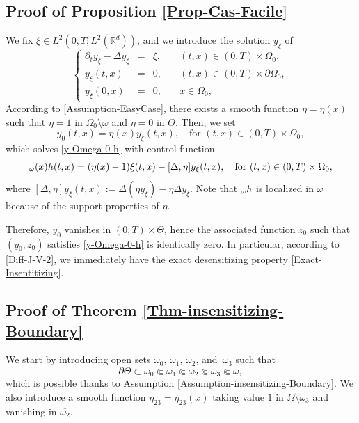\documentclass[11pt]{article}
\makeatletter
\numberwithin{equation}{section}
\DeclareRobustCommand{\mathbbm}[1]{\csname jepbb@#1\endcsname}
\newcommand\R{{\mathbb R}}
\theoremstyle{definition}
\makeatother
\begin{document}
\subsection{Proof of Proposition \ref{Prop-Cas-Facile}}
\label{Sec-Proof-Prop-Cas-Facile}
We fix $\xi \in L^2(0,T; L^2(\R^d))$, and we introduce the solution $y_\xi$ of
\begin{equation*}
\left\{
\begin{array}{rcll}
\partial_t y_\xi - \Delta y_\xi &=& \xi, \quad & (t,x) \in (0,T) \times \Omega_0,
\\
y_\xi(t, x) &=& 0, \quad & (t,x) \in (0,T) \times \partial \Omega_0,
\\
y_\xi(0,x) &=& 0, \quad & x \in \Omega_0,
\end{array}
\right.
\end{equation*}
According to \eqref{Assumption-EasyCase}, there exists a smooth function $\eta = \eta(x)$ such that $\eta = 1$ in $\Omega_0 \setminus \omega$ and $\eta=0$ in $\Theta$. Then, we set
\[
y_0(t,x) = \eta(x) y_\xi(t,x), \quad \text{for } (t,x) \in (0,T) \times \Omega_0,
\]
which solves \eqref{y-Omega-0-h} with control function
\[
\mathbbm{1}_{\omega}(x)h(t,x) = (\eta(x) -1) \xi(t,x) - [\Delta, \eta] y_\xi(t,x), \quad \text{for } (t,x) \in (0,T) \times \Omega_0,
\]
where $[\Delta, \eta] y_\xi(t,x):=\Delta (\eta y_\xi)-\eta \Delta y_\xi$. Note that $\mathbbm{1}_{\omega} h$ is localized in $\omega$ because of the support properties of $\eta$.

Therefore, $y_0$ vanishes in $(0,T) \times \Theta$, hence the associated function $z_0$ such that $(y_0,z_0)$ satisfies \eqref{y-Omega-0-h} is identically zero. In particular, according to \eqref{Diff-J-V-2}, we immediately have the exact desensitizing property \eqref{Exact-Insentitizing}.

\subsection{Proof of Theorem \ref{Thm-insensitizing-Boundary}}
\label{Sec-Proof-Thm-insensitizing-Boundary}

We start by introducing open sets $\omega_0$, $\omega_1$, $\omega_2$, and~$\omega_3$ such that
\begin{equation*}
\partial \Theta \subset \omega_0 \Subset \omega_1 \Subset \omega_2 \Subset \omega_3 \Subset \omega,
\end{equation*}
which is possible thanks to Assumption \eqref{Assumption-insensitizing-Boundary}.
We also introduce a smooth function $\eta_{23} = \eta_{23}(x)$ taking value $1$ in $\Omega \setminus \overline{\omega_3}$ and vanishing in $\overline{\omega_2}$.
\end{document}
